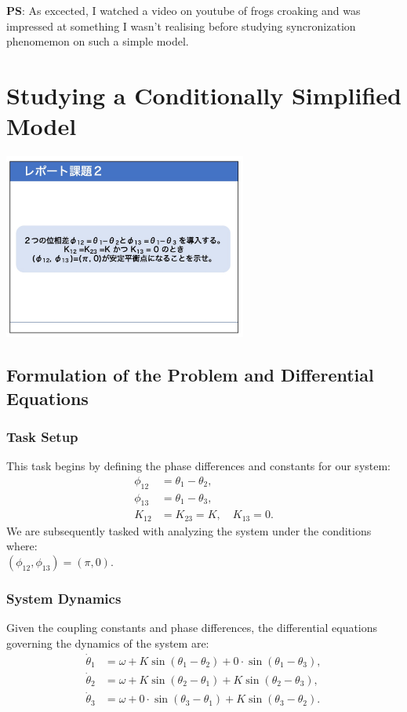 \documentclass[12pt,a4paper]{article}
\begin{document}
\textbf{PS}: As excected, I watched a video on youtube of frogs croaking and was impressed at something I wasn't realising before studying syncronization phenomemon on such a simple model.  

\section{Studying a Conditionally Simplified Model}

\begin{center}
    \includegraphics[width=0.6\textwidth]{materials/task2.jpeg}
\end{center}

\subsection{Formulation of the Problem and Differential Equations}

\subsubsection{Task Setup}
This task begins by defining the phase differences and constants for our system:
\begin{align*}
    \phi_{12} &= \theta_1 - \theta_2, \\
    \phi_{13} &= \theta_1 - \theta_3, \\
    K_{12} &= K_{23} = K, \quad K_{13} = 0.
\end{align*}
We are subsequently tasked with analyzing the system under the conditions where: \\ \((\phi_{12}, \phi_{13}) = (\pi, 0)\).

\subsubsection{System Dynamics}
Given the coupling constants and phase differences, the differential equations governing the dynamics of the system are:
\begin{align}
    \dot{\theta}_1 &= \omega + K \sin(\theta_1 - \theta_2) + 0 \cdot \sin(\theta_1 - \theta_3), \\
    \dot{\theta}_2 &= \omega + K \sin(\theta_2 - \theta_1) + K \sin(\theta_2 - \theta_3), \\
    \dot{\theta}_3 &= \omega + 0 \cdot \sin(\theta_3 - \theta_1) + K \sin(\theta_3 - \theta_2).
\end{align}
\end{document}
